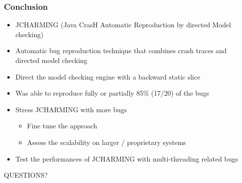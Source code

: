 \documentclass{beamer}
\begin{document}
\begin{frame}
\frametitle{Conclusion}

\begin{itemize}
\item JCHARMING (Java CrasH Automatic
Reproduction by directed Model checking)
\item Automatic bug
reproduction technique that combines crash traces and
directed model checking
\item Direct the model checking engine with a backward static slice
\item Was able to reproduce fully or partially 85\% (17/20) of the bugs
\vspace{0.5cm}
\item Stress JCHARMING with more bugs
\begin{itemize}
\item Fine tune the approach
\item Assess the scalability on larger / proprietary systems
\end{itemize}
\item Test the performances of JCHARMING with multi-threading related bugs


\end{itemize}

\end{frame}



\begin{frame}
\Huge{\centerline{QUESTIONS?}}
\end{frame}

\end{document}

